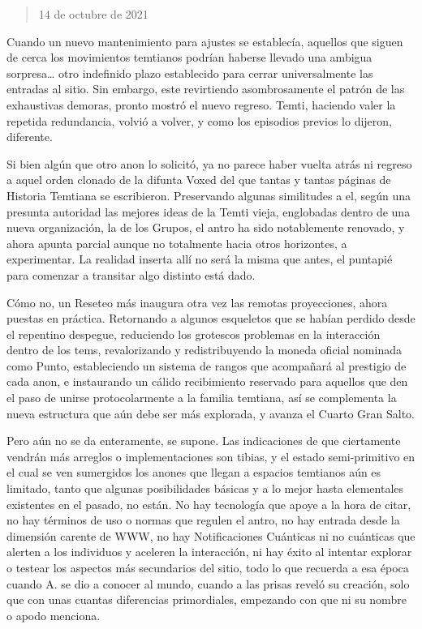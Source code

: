 \documentclass[
]{book}
\begin{document}
\begin{quote}
14 de octubre de 2021
\end{quote}

Cuando un nuevo mantenimiento para ajustes se establecía, aquellos que siguen de cerca los movimientos temtianos podrían haberse llevado una ambigua sorpresa\ldots{} otro indefinido plazo establecido para cerrar universalmente las entradas al sitio. Sin embargo, este revirtiendo asombrosamente el patrón de las exhaustivas demoras, pronto mostró el nuevo regreso. Temti, haciendo valer la repetida redundancia, volvió a volver, y como los episodios previos lo dijeron, diferente.

Si bien algún que otro anon lo solicitó, ya no parece haber vuelta atrás ni regreso a aquel orden clonado de la difunta Voxed del que tantas y tantas páginas de Historia Temtiana se escribieron. Preservando algunas similitudes a el, según una presunta autoridad las mejores ideas de la Temti vieja, englobadas dentro de una nueva organización, la de los Grupos, el antro ha sido notablemente renovado, y ahora apunta parcial aunque no totalmente hacia otros horizontes, a experimentar. La realidad inserta allí no será la misma que antes, el puntapié para comenzar a transitar algo distinto está dado.

Cómo no, un Reseteo más inaugura otra vez las remotas proyecciones, ahora puestas en práctica. Retornando a algunos esqueletos que se habían perdido desde el repentino despegue, reduciendo los grotescos problemas en la interacción dentro de los tems, revalorizando y redistribuyendo la moneda oficial nominada como Punto, estableciendo un sistema de rangos que acompañará al prestigio de cada anon, e instaurando un cálido recibimiento reservado para aquellos que den el paso de unirse protocolarmente a la familia temtiana, así se complementa la nueva estructura que aún debe ser más explorada, y avanza el Cuarto Gran Salto.

Pero aún no se da enteramente, se supone. Las indicaciones de que ciertamente vendrán más arreglos o implementaciones son tibias, y el estado semi-primitivo en el cual se ven sumergidos los anones que llegan a espacios temtianos aún es limitado, tanto que algunas posibilidades básicas y a lo mejor hasta elementales existentes en el pasado, no están. No hay tecnología que apoye a la hora de citar, no hay términos de uso o normas que regulen el antro, no hay entrada desde la dimensión carente de WWW, no hay Notificaciones Cuánticas ni no cuánticas que alerten a los individuos y aceleren la interacción, ni hay éxito al intentar explorar o testear los aspectos más secundarios del sitio, todo lo que recuerda a esa época cuando A. se dio a conocer al mundo, cuando a las prisas reveló su creación, solo que con unas cuantas diferencias primordiales, empezando con que ni su nombre o apodo menciona.
\end{document}
